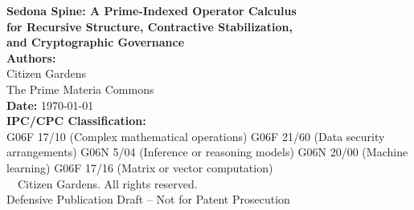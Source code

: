 \documentclass[12pt]{article}
\theoremstyle{plain}
\theoremstyle{definition}
\theoremstyle{remark}
\renewcommand{\maketitle}{
    \begin{center}
        {\Large \textbf{Sedona Spine: A Prime-Indexed Operator Calculus}} \\[0.2cm]
        {\Large \textbf{for Recursive Structure, Contractive Stabilization,}} \\[0.2cm]
        {\Large \textbf{and Cryptographic Governance}}
         \\ [0.2cm]
        \textbf{Authors:} \\[0.2cm]
        Citizen Gardens \\[0.2cm]
        The Prime Materia Commons \\ [0.2cm]
        \textbf{Date:} \today \\[1.5cm]
        \textbf{IPC/CPC Classification:} \\
        G06F 17/10 (Complex mathematical operations) \quad
        G06F 21/60 (Data security arrangements) \quad
        G06N 5/04 (Inference or reasoning models) \quad
        G06N 20/00 (Machine learning) \quad
        G06F 17/16 (Matrix or vector computation) \\[1.5cm]
        {\footnotesize \textcopyright\ \the\year\ Citizen Gardens. All rights reserved.} \\
        {\footnotesize Defensive Publication Draft -- Not for Patent Prosecution}
    \end{center}
}
\begin{document}
\maketitle

\begin{abstract}

This publication discloses the implementation of the \textit{Sedona Spine}, a unified, multi-layered research and compute stack designed to enforce recursive stability and formal integrity across heterogeneous data systems. The architecture integrates four distinct strata into a single "stack of stacks":

\begin{itemize}
    \item \textbf{Low-Level Encoding Rail (L0):} Anchored by \textbf{CRMF} for request and archival state transfer, \textbf{Goldilocks} for exact prime-field arithmetic ($p=2^{64}-2^{32}+1$) providing a fast proving substrate, and \textbf{C768} as an intermediate compression primitive.
    \item \textbf{Representational Rail:} Utilizes \textbf{Atlas} and \textbf{Hologram} layers to establish high-dimensional, structured geometric and compositional meaning. This stratum defines how the system stores and transforms meaning without compromising proof-critical logic.
    \item \textbf{Certification and Governance Rail:} Governed by the \textbf{Pro/Commons} dual-chamber model. It utilizes recursive proofs and \textbf{RSL v5} (Re-entry Stability Logic) to establish an immutable trust boundary, enforcing "Sealed Veto-Enforced Adaptation".
    \item \textbf{Cognitive/Adaptive Rail:} Implements \textbf{Neuroplasticity} (e.g., EchoBraid) as an interpretive stratum. This layer models adaptive learning and identity stability, though its transitions are strictly gated by the underlying certification rail to prevent constitutional leakage or numerical drift.
\end{itemize}

By mapping these layers to measurable verification gates—such as \textbf{DUR-003} Stale-Owner Fencing and \textbf{RT-001} Tool Broker Panic—the Sedona Spine ensures "Zero Drift" and maintains a definitive "Path of Integrity" from low-level SUBLEQ instructions to high-level application orchestration.

\end{abstract}
\end{document}

